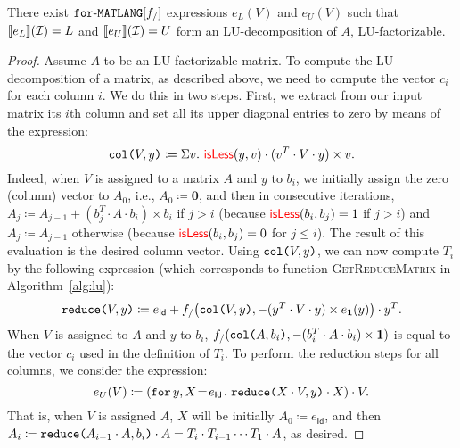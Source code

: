\begin{proposition}\label{prop:gauss}
There exist $\langforf{f_/}$ expressions $e_L(V)$ and $e_U(V)$ such that
$\sem{e_L}{\I}=L$ and $\sem{e_U}{\I}=U$ form an LU-decomposition of $A$,
 LU-factorizable.
\end{proposition}
\begin{proof}
Assume $A$ to be an LU-factorizable matrix. To compute the LU decomposition of a matrix, as described above, we need to compute the vector $c_i$ for each column $i$. We do this in two steps. First, we extract from our input matrix its $i$th column and set all its upper diagonal entries to zero
by means of 
 the 
 expression:
$$\ccol{V}{y} \coloneqq   \Sigma v. \  \EDIT{\isless}(y,v)\cdot(v^T\cdot V \cdot y)\times v.$$
Indeed, when $V$ is assigned to a matrix $A$ and $y$ to $b_i$, we initially assign the zero (column) vector to $A_0$, i.e., 
$A_0\coloneqq  \mathbf{0}$, and then in consecutive iterations,  $A_j\coloneqq  A_{j-1}+ (b_j^T\cdot A\cdot b_i)\times b_i$ if $j>i$ (because $\EDIT{\isless}(b_i,b_j)=1$ if $j>i$) and $A_j\coloneqq A_{j-1}$ otherwise (because $\EDIT{\isless}(b_i,b_j)=0$ for $j\leq i$). The result of this evaluation is the desired column vector.
Using $\ccol{V}{y}$, we can now compute $T_i$ by the following expression (which corresponds to function \textsc{GetReduceMatrix} in Algorithm~\ref{alg:lu}):
$$\red{V}{y} \coloneqq   e_{\mathsf{Id}}+ f_/\bigl(\ccol{V}{y},-(y^T\cdot V\cdot y)\times e_{\ones}(y)\bigr)\cdot y^T.$$
When $V$ is assigned to $A$ and $y$ to $b_i$, $f_/(\ccol{A}{b_i},-(b_i^T\cdot A\cdot b_i)\times \ones)$ is equal to the vector $c_i$ used in the definition of $T_i$. To perform the reduction steps for all columns, we consider
the expression:
$$
e_{U}(V) \coloneqq    \left( \initf{e_{\mathsf{Id}}}{y}{X}{\red{X\cdot V}{y}\cdot X} \right) \cdot V.
$$
That is, when $V$ is assigned $A$, $X$ will be initially $A_0\coloneqq  e_{\mathsf{Id}}$, and then
$A_i\coloneqq  \red{A_{i-1}\cdot A}{b_i}\cdot A=T_i\cdot T_{i-1}\cdots T_1\cdot A$, as desired. 


\end{proof}
